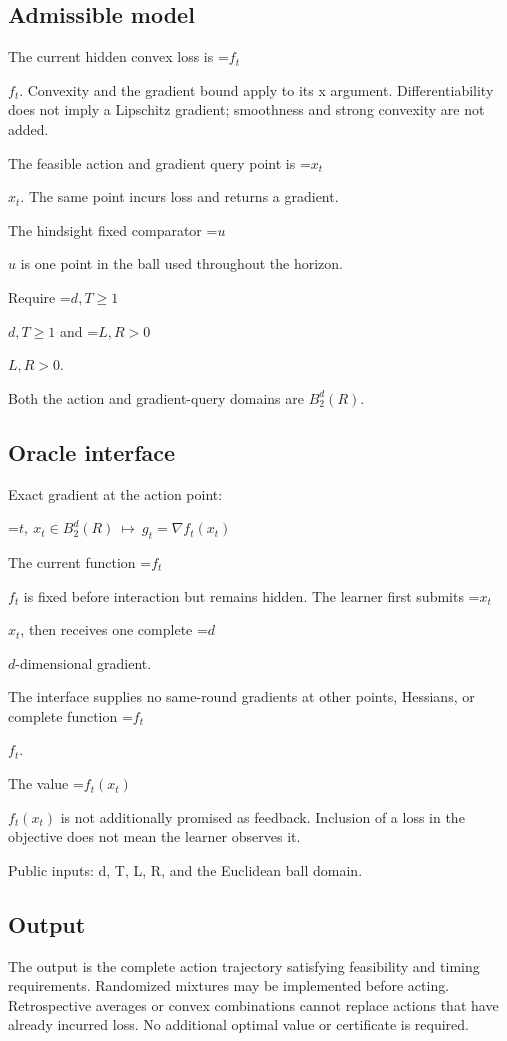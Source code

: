 \documentclass[10pt,a4paper]{article}
\newcommand{\AtlasMath}[1]{\par\begingroup\centering\setbox0=\hbox{$\displaystyle #1$}\ifdim\wd0>1.4\linewidth\typeout{ATLAS WIDE FORMULA: \the\wd0}\fi\ifdim\wd0>\linewidth\resizebox{\linewidth}{!}{\box0}\else\box0\fi\par\endgroup}
\newcommand{\AtlasInlineMath}[1]{\begingroup\setbox0=\hbox{$#1$}\ifdim\wd0>.4\linewidth\endgroup\AtlasMath{#1}\else\endgroup$#1$\fi}
\begin{document}
\subsection{Admissible model}
The current hidden convex loss is \AtlasInlineMath{f_t}. Convexity and the gradient bound apply to its x argument. Differentiability does not imply a Lipschitz gradient; smoothness and strong convexity are not added.

The feasible action and gradient query point is \AtlasInlineMath{x_t}. The same point incurs loss and returns a gradient.

The hindsight fixed comparator \AtlasInlineMath{u} is one point in the ball used throughout the horizon.

Require \AtlasInlineMath{d,T\ge1} and \AtlasInlineMath{L,R>0}.

Both the action and gradient-query domains are $B_2^{d}(R)$.

\subsection{Oracle interface}
Exact gradient at the action point:


\AtlasMath{t,\ x_t\in B_2^d(R)\ \longmapsto\ g_t=\nabla f_t(x_t)}


The current function \AtlasInlineMath{f_t} is fixed before interaction but remains hidden. The learner first submits \AtlasInlineMath{x_t}, then receives one complete \AtlasInlineMath{d}-dimensional gradient.

The interface supplies no same-round gradients at other points, Hessians, or complete function \AtlasInlineMath{f_t}.

The value \AtlasInlineMath{f_t(x_t)} is not additionally promised as feedback. Inclusion of a loss in the objective does not mean the learner observes it.

Public inputs: d, T, L, R, and the Euclidean ball domain.

\subsection{Output}
The output is the complete action trajectory satisfying feasibility and timing requirements. Randomized mixtures may be implemented before acting. Retrospective averages or convex combinations cannot replace actions that have already incurred loss. No additional optimal value or certificate is required.
\end{document}
